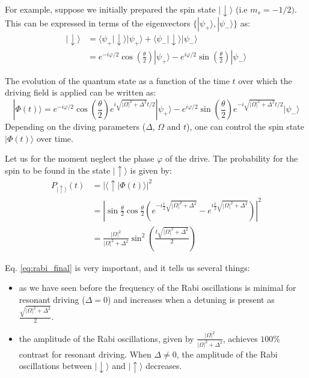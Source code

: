 \documentclass[a4paper,11pt]{article}
\newcommand{\ket}[1]{| #1 \rangle}
\newcommand{\braket}[2]{\langle #1 | #2 \rangle}
\begin{document}
For example, suppose we initially prepared the spin state $\ket{\downarrow}$ (i.e $m_s = -1/2)$. This can be expressed in terms of the eigenvectors $\lbrace \ket{\psi_+}, \ket{\psi_-} \rbrace$ as:
\begin{equation}
\begin{split}
    \ket{\downarrow}& = \braket{\psi_+}{\downarrow}  \ket{\psi_+} + \braket{\psi_-}{\downarrow}  \ket{\psi_-}\\
    &= e^{-i\varphi/2} \cos{\left( \frac{\theta}{2}\right)}\ket{\psi_+} - e^{i\varphi/2} \sin{\left( \frac{\theta}{2}\right)}\ket{\psi_-}
\end{split}
\end{equation}

The evolution of the quantum state as a function of the time $t$ over which the driving field is applied can be written as:
\begin{equation}
    \ket{\Phi (t)} = e^{-i\varphi/2} \cos{\left( \frac{\theta}{2}\right)} e^{i\sqrt{|\Omega|^2+\Delta^2}t/2}\ket{\psi_+} - e^{i\varphi/2} \sin{\left( \frac{\theta}{2}\right)}e^{-i\sqrt{|\Omega|^2+\Delta^2}t/2}\ket{\psi_-}
\end{equation}
Depending on the diving parameters ($\Delta$, $\Omega$ and $t$), one can control the spin state $\ket{\Phi (t)}$ over time.

Let us for the moment neglect the phase $\varphi$ of the drive. The probability for the spin to be found in the state $\ket{\uparrow}$ is given by:
\begin{equation}
\begin{split}
    P_{\ket{\uparrow}}(t) &= |\braket{\uparrow}{\Phi(t)}|^2\\
    &= \left| \sin{\frac{\theta}{2}}\cos{\frac{\theta}{2} \left(e^{-i\frac{t}{2}\sqrt{|\Omega|^2+\Delta^2}} - e^{i\frac{t}{2}\sqrt{|\Omega|^2+\Delta^2}} \right)}\right|^2\\
    &= \frac{|\Omega|^2}{|\Omega|^2+\Delta^2} \sin^2{\left( \frac{t\sqrt{|\Omega|^2+\Delta^2}}{2}\right)} \label{eq:rabi_final}
\end{split}
\end{equation}

Eq. \ref{eq:rabi_final} is very important, and it tells us several things:
\begin{itemize}
    \item as we have seen before the frequency of the Rabi oscillations is minimal for resonant driving ($\Delta = 0$) and increases when a detuning is present as $\frac{\sqrt{|\Omega|^2+\Delta^2}}{2}$.
    \item the amplitude of the Rabi oscillations, given by $\frac{|\Omega|^2}{|\Omega|^2+\Delta^2}$, achieves $100\%$ contrast for resonant driving. When $\Delta \neq 0$, the amplitude of the Rabi oscillations between $\ket{\downarrow}$ and $\ket{\uparrow}$ decreases. 
\end{itemize}
\end{document}
